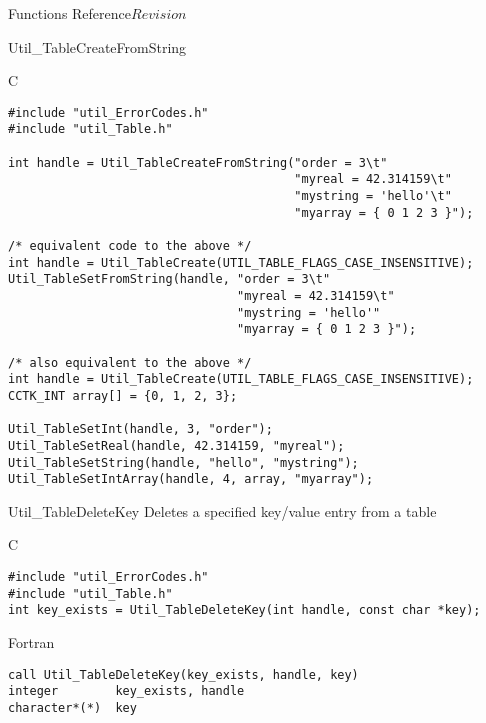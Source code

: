 \begin{cactuspart}{ Functions Reference}{}{$Revision$}
\begin{FunctionDescription}{Util\_TableCreateFromString}
\begin{ExampleSection}
\begin{Example}{C}
\begin{verbatim}
#include "util_ErrorCodes.h"
#include "util_Table.h"

int handle = Util_TableCreateFromString("order = 3\t"
                                        "myreal = 42.314159\t"
                                        "mystring = 'hello'\t"
                                        "myarray = { 0 1 2 3 }");

/* equivalent code to the above */
int handle = Util_TableCreate(UTIL_TABLE_FLAGS_CASE_INSENSITIVE);
Util_TableSetFromString(handle, "order = 3\t"
                                "myreal = 42.314159\t"
                                "mystring = 'hello'"
                                "myarray = { 0 1 2 3 }");

/* also equivalent to the above */
int handle = Util_TableCreate(UTIL_TABLE_FLAGS_CASE_INSENSITIVE);
CCTK_INT array[] = {0, 1, 2, 3};

Util_TableSetInt(handle, 3, "order");
Util_TableSetReal(handle, 42.314159, "myreal");
Util_TableSetString(handle, "hello", "mystring");
Util_TableSetIntArray(handle, 4, array, "myarray");
\end{verbatim}
\end{Example}
\end{ExampleSection}
\end{FunctionDescription}


\begin{FunctionDescription}{Util\_TableDeleteKey}
\label{Util-TableDeleteKey}
Deletes a specified key/value entry from a table

\begin{SynopsisSection}
\begin{Synopsis}{C}
\begin{verbatim}
#include "util_ErrorCodes.h"
#include "util_Table.h"
int key_exists = Util_TableDeleteKey(int handle, const char *key);
\end{verbatim}
\end{Synopsis}
\begin{Synopsis}{Fortran}
\begin{verbatim}
call Util_TableDeleteKey(key_exists, handle, key)
integer        key_exists, handle
character*(*)  key
\end{verbatim}
\end{Synopsis}
\end{SynopsisSection}


\end{FunctionDescription}
\end{cactuspart}
